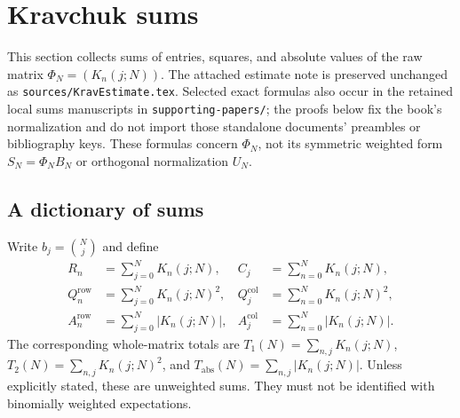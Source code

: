 \section{Kravchuk sums}
\label{sec:kravchuk-sums}
This section collects sums of entries, squares, and absolute values of the raw matrix $\Phi_N=(K_n(j;N))$. The attached estimate note is preserved unchanged as \texttt{sources/KravEstimate.tex}. Selected exact formulas also occur in the retained local sums manuscripts in \texttt{supporting-papers/}; the proofs below fix the book's normalization and do not import those standalone documents' preambles or bibliography keys. These formulas concern $\Phi_N$, not its symmetric weighted form $S_N=\Phi_NB_N$ or orthogonal normalization $U_N$.

\subsection{A dictionary of sums}
Write $b_j=\binom Nj$ and define
\begin{align*}
R_n&=\sum_{j=0}^N K_n(j;N),& C_j&=\sum_{n=0}^N K_n(j;N),\\
Q_n^{\mathrm{row}}&=\sum_{j=0}^N K_n(j;N)^2,&Q_j^{\mathrm{col}}&=\sum_{n=0}^N K_n(j;N)^2,\\
A_n^{\mathrm{row}}&=\sum_{j=0}^N|K_n(j;N)|,&A_j^{\mathrm{col}}&=\sum_{n=0}^N|K_n(j;N)|.
\end{align*}
The corresponding whole-matrix totals are $T_1(N)=\sum_{n,j}K_n(j;N)$, $T_2(N)=\sum_{n,j}K_n(j;N)^2$, and $T_{\mathrm{abs}}(N)=\sum_{n,j}|K_n(j;N)|$. Unless explicitly stated, these are unweighted sums. They must not be identified with binomially weighted expectations.

